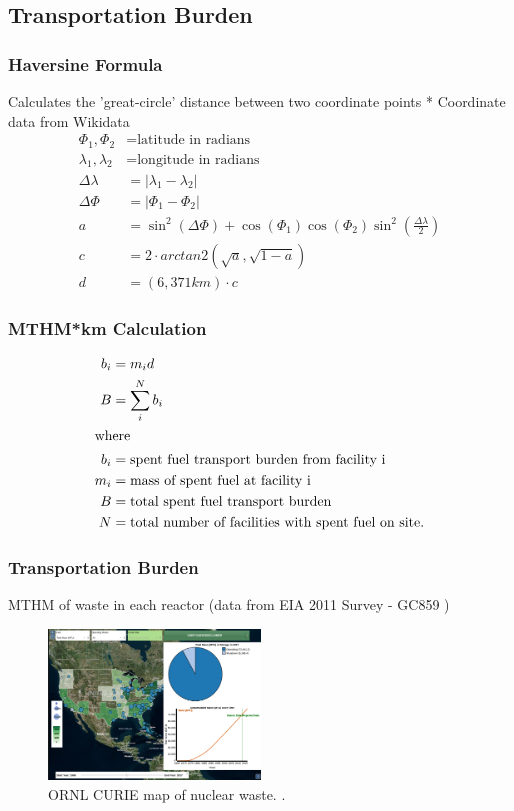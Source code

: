 \subsection{Transportation Burden}

\begin{frame}
	\frametitle{Haversine Formula}
	Calculates the 'great-circle' distance between two coordinate points
	* Coordinate data from Wikidata
	\begin{align} 
	\Phi_1,\Phi_2&= \mbox{latitude in radians}\\
	\lambda_1,\lambda_2 &= \mbox{longitude in radians}\\
	\Delta\lambda &= \left|\lambda_1 - \lambda_2\right|\\
	\Delta\Phi &= \left|\Phi_1 - \Phi_2\right|\\
	a&=\sin^2(\Delta\Phi)+\cos(\Phi_1)\cos(\Phi_2)\sin^2{\left(\frac{\Delta\lambda}{2}\right)}\\
	c &= 2 \cdot arctan2(\sqrt{a},\sqrt{1-a})\\
	d &=  (6,371km) \cdot c
	\end{align}
	
\end{frame}

\begin{frame}
	\frametitle{MTHM*km Calculation}
	\begin{align}
	b_i &= m_id\\
	B &= \sum_i^N b_i\\
	\intertext{where}
	b_i &= \mbox{spent fuel transport burden from facility i}\\
	m_i &= \mbox{mass of spent fuel at facility i}\\
	B &= \mbox{total spent fuel transport burden}\\
	N &= \mbox{total number of facilities with spent fuel on site.}
	\end{align}
\end{frame}

\begin{frame}
	\frametitle{Transportation Burden}
	MTHM of waste in each reactor (data from EIA 2011 Survey - GC859 \cite{domenico_gc-859_2016})
	\begin{figure}[htbp!]
		\begin{center}
			\includegraphics[height=4cm]{./images/curie_map}
		\end{center}
		\caption{ORNL CURIE map of nuclear waste. \cite{ornl_centralized_2016}.}
		\label{fig:curie_map}
	\end{figure}

\end{frame}

